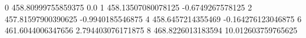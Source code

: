 0 458.80999755859375 0.0
1 458.13507080078125 -0.6749267578125
2 457.81597900390625 -0.9940185546875
4 458.6457214355469 -0.164276123046875
6 461.6044006347656 2.794403076171875
8 468.8226013183594 10.012603759765625
